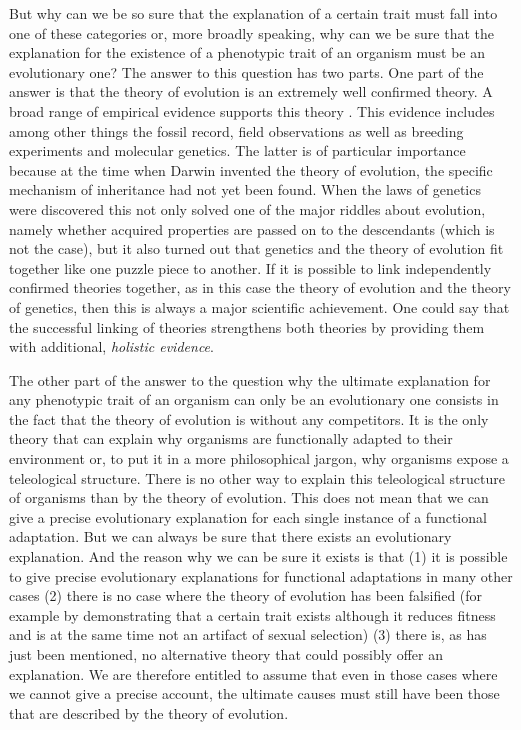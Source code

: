 But why can we be so sure that the explanation of a certain trait must
fall into one of these categories or, more broadly speaking, why can
we be sure that the explanation for the existence of a phenotypic
trait of an organism must be an evolutionary one? The answer to this
question has two parts. One part of the answer is that the theory of
evolution is an extremely well confirmed theory. A broad range of
empirical evidence supports this theory
\cite[p.\  12ff.]{mayr:2001}. This evidence includes among other things
the fossil record, field observations as well as breeding experiments
and molecular genetics. The latter is of particular importance because
at the time when Darwin invented the theory of evolution, the specific
mechanism of inheritance had not yet been found. When the laws of
genetics were discovered this not only solved one of the major riddles
about evolution, namely whether acquired properties are passed on to
the descendants (which is not the case), but it also turned out that
genetics and the theory of evolution fit together like one puzzle
piece to another. If it is possible to link independently confirmed
theories together, as in this case the theory of evolution and the
theory of genetics, then this is always a major scientific
achievement. One could say that the successful linking of theories
strengthens both theories by providing them with additional, {\em
  holistic evidence}.

The other part of the answer to the question why the ultimate explanation for
any phenotypic trait of an organism can only be an evolutionary one consists
in the fact that the theory of evolution is without any competitors. It is the
only theory that can explain why organisms are functionally adapted to their
environment or, to put it in a more philosophical jargon, why organisms expose
a teleological structure. There is no other way to explain this teleological
structure of organisms than by the theory of evolution. This does not mean
that we can give a precise evolutionary explanation for each single instance
of a functional adaptation. But we can always be sure that there exists an
evolutionary explanation. And the reason why we can be sure it exists is that
(1) it is possible to give precise evolutionary explanations for functional
adaptations in many other cases (2) there is no case where the theory of
evolution has been falsified (for example by demonstrating that a certain
trait exists although it reduces fitness and is at the same time not an
artifact of sexual selection) (3) there is, as has just been mentioned, no
alternative theory that could possibly offer an explanation. We are therefore
entitled to assume that even in those cases where we cannot give a precise
account, the ultimate causes must still have been those that are described
by the theory of evolution.

